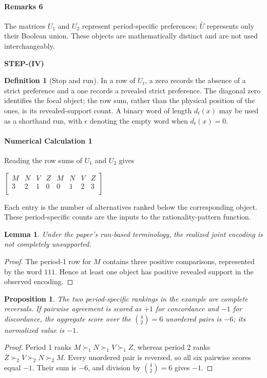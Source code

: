 \documentclass[conference]{IEEEtran}
\theoremstyle{plain}
\newtheorem{lemma}{Lemma}
\newtheorem{proposition}{Proposition}
\theoremstyle{definition}
\newtheorem{definition}{Definition}
\theoremstyle{remark}
\begin{document}
	\paragraph{Remarks 6} The matrices $U_1$ and $U_2$ represent period-specific preferences; $\bar U$ represents only their Boolean union. These objects are mathematically distinct and are not used interchangeably.
	\begin{center}
		\textbf{STEP-(IV)}
	\end{center}
	\begin{definition}[Stop and run]
		In a row of $U_t$, a zero records the absence of a strict preference and a one records a revealed strict preference. The diagonal zero identifies the focal object; the row sum, rather than the physical position of the ones, is its revealed-support count. A binary word of length $d_t(x)$ may be used as a shorthand run, with $\epsilon$ denoting the empty word when $d_t(x)=0$.
	\end{definition}
	\paragraph{Numerical Calculation 1} Reading the row sums of $U_1$ and $U_2$ gives
	\begin{center}
		$ 
		\begin{bmatrix}
			M & N & V & Z & M & N & V & Z \\
			3 & 2 & 1 & 0 & 0 & 1 & 2 & 3\\
		\end{bmatrix}
		$
	\end{center}
	Each entry is the number of alternatives ranked below the corresponding object. These period-specific counts are the inputs to the rationality-pattern function.
	\begin{lemma}\label{lem:example-not-completely-irrational}
		Under the paper’s run-based terminology, the realized joint encoding is not completely unsupported.
	\end{lemma}
	\begin{proof}
		The period-1 row for $M$ contains three positive comparisons, represented by the word $111$. Hence at least one object has positive revealed support in the observed encoding.
	\end{proof}
	\begin{proposition}\label{prop:complete-reversal}
		The two period-specific rankings in the example are complete reversals. If pairwise agreement is scored as $+1$ for concordance and $-1$ for discordance, the aggregate score over the $\binom{4}{2}=6$ unordered pairs is $-6$; its normalized value is $-1$.
		\end{proposition}
		\begin{proof}
			Period 1 ranks $M\succ_1N\succ_1V\succ_1Z$, whereas period 2 ranks $Z\succ_2V\succ_2N\succ_2M$. Every unordered pair is reversed, so all six pairwise scores equal $-1$. Their sum is $-6$, and division by $\binom{4}{2}=6$ gives $-1$.
		\end{proof}
\end{document}
